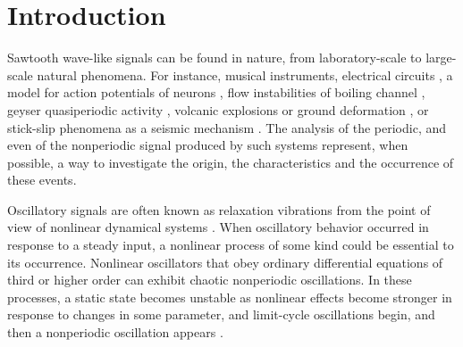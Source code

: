 \documentclass[aps,pre,preprint,groupedaddress,showkeys]{revtex4-2}
\begin{document}

\maketitle

\section{Introduction}\label{intro}
Sawtooth wave-like signals can be found in nature, from laboratory-scale to large-scale natural phenomena. 
For instance, musical instruments, electrical circuits \citep{VANDERPOL1927, Kanamaru2007}, a model for action potentials of neurons \citep{FitzHugh1961}, flow instabilities of boiling channel \citep{Ozawa1979}, geyser quasiperiodic activity \citep{NishimuraIchihara2006}, volcanic explosions or ground deformation \citep{Fujita2004, Iguchi2008, Genco2010}, or stick-slip phenomena as a seismic mechanism \citep{Brace1966}.
The analysis of the periodic, and even of the nonperiodic signal produced by such systems represent, when possible, a way to investigate the origin, the characteristics and the occurrence of these events.

Oscillatory signals are often known as relaxation vibrations from the point of view of nonlinear dynamical systems \citep{Kanamaru2007}.
When oscillatory behavior occurred in response to a steady input, a nonlinear process of some kind could be essential to its occurrence.
Nonlinear oscillators that obey ordinary differential equations of third or higher order can exhibit chaotic nonperiodic oscillations.
In these processes, a static state becomes unstable as nonlinear effects become stronger in response to changes in some parameter, and limit-cycle oscillations begin, and then a nonperiodic oscillation appears \citep{Lorenz1963, Strogatz1994}.
\end{document}
